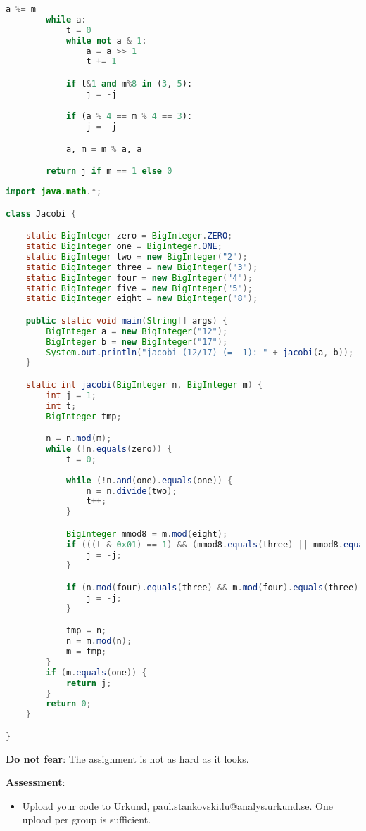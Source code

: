 \documentclass{article}
\begin{document}
\begin{description}
{\begin{lstlisting}[float=htb, style=customc, language=python, caption={The Jacobi symbol in Python.}, label={lst:jacobi}]
        a %= m
        while a:
            t = 0
            while not a & 1:
                a = a >> 1
                t += 1

            if t&1 and m%8 in (3, 5):
                j = -j

            if (a % 4 == m % 4 == 3):
                j = -j

            a, m = m % a, a

        return j if m == 1 else 0
    \end{lstlisting}
    
    \newpage
    
    \begin{lstlisting}[float=h, style=customc, language=java, caption={The Jacobi symbol in Java.}, label={lst:jacobi_java}]
import java.math.*;

class Jacobi {

	static BigInteger zero = BigInteger.ZERO;
	static BigInteger one = BigInteger.ONE;
	static BigInteger two = new BigInteger("2");
	static BigInteger three = new BigInteger("3");
	static BigInteger four = new BigInteger("4");
	static BigInteger five = new BigInteger("5");
	static BigInteger eight = new BigInteger("8");

	public static void main(String[] args) {
		BigInteger a = new BigInteger("12");
		BigInteger b = new BigInteger("17");
		System.out.println("jacobi (12/17) (= -1): " + jacobi(a, b));
	}

	static int jacobi(BigInteger n, BigInteger m) {
		int j = 1;
		int t;
		BigInteger tmp;

		n = n.mod(m);
		while (!n.equals(zero)) {
			t = 0;
		
			while (!n.and(one).equals(one)) {
				n = n.divide(two);
				t++;
			}

			BigInteger mmod8 = m.mod(eight);
			if (((t & 0x01) == 1) && (mmod8.equals(three) || mmod8.equals(five))) {
				j = -j;
			}

			if (n.mod(four).equals(three) && m.mod(four).equals(three)) {
				j = -j;
			}

			tmp = n;
			n = m.mod(n);
			m = tmp;
		}
		if (m.equals(one)) {
			return j;
		}
		return 0;
	}

}
    \end{lstlisting}
    
    \textbf{Do not fear}: The assignment is not as hard as it looks.
    
	\textbf{Assessment}:
	\begin{itemize}
		\item Upload your code to Urkund, paul.stankovski.lu@analys.urkund.se.
        One upload per group is sufficient.
        

\end{itemize}}
\end{description}
\end{document}
